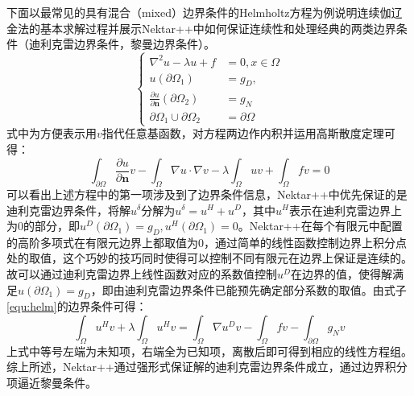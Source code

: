 下面以最常见的具有混合（mixed）边界条件的Helmholtz方程为例说明连续伽辽金法的基本求解过程并展示Nektar++中如何保证连续性和处理经典的两类边界条件（迪利克雷边界条件，黎曼边界条件）。
\begin{equation}
\left\{
\begin{aligned}
	\nabla^2 u - \lambda u + f &= 0, x \in \Omega \\
	u(\partial \Omega_1) &= g_{D},\\
	\frac{\partial u}{\partial \bm n}(\partial\Omega_2) &= g_{N}\\
	\partial\Omega_1\cup\partial\Omega_2 &= \partial\Omega
\end{aligned}
\right.
\label{equ:helm}
\end{equation}
式中为方便表示用$v$指代任意基函数，对方程两边作内积并运用高斯散度定理可得：
$$\int_{\partial\Omega}\frac{\partial u}{\partial \bm n}v - \int_{\Omega} \nabla u\cdot \nabla v - \lambda\int_{\Omega}uv + \int_{\Omega}fv = 0$$
可以看出上述方程中的第一项涉及到了边界条件信息，Nektar++中优先保证的是迪利克雷边界条件，将解$u^{\delta}$分解为$u^{\delta} = u^{H} + u^{D}$，其中$u^{H}$表示在迪利克雷边界上为0的部分，即$u^{D}(\partial\Omega_1) = g_{D}, u^{H}(\partial\Omega_1) = 0$。Nektar++在每个有限元中配置的高阶多项式在有限元边界上都取值为0，通过简单的线性函数控制边界上积分点处的取值，这个巧妙的技巧同时使得可以控制不同有限元在边界上保证是连续的。故可以通过迪利克雷边界上线性函数对应的系数值控制$u^{D}$在边界的值，使得解满足$u(\partial \Omega_1) = g_{D}$，即由迪利克雷边界条件已能预先确定部分系数的取值。由式子\ref{equ:helm}的边界条件可得：
$$\int_{\Omega}u^{H}v + \lambda\int_{\Omega}u^{H}v = \int_{\Omega}\nabla u^{D}v - \int_{\Omega}fv - \int_{\partial\Omega}g_{N}v$$
上式中等号左端为未知项，右端全为已知项，离散后即可得到相应的线性方程组。综上所述，Nektar++通过强形式保证解的迪利克雷边界条件成立，通过边界积分项逼近黎曼条件。

